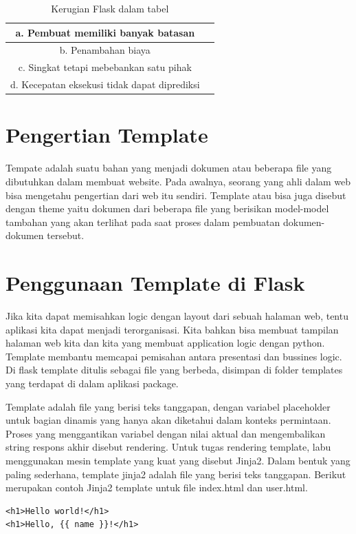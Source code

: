 \begin{table} [ht]
\caption{Kerugian Flask dalam tabel}
\centering
\begin {tabular} {|cc|}
\hline
a. Pembuat memiliki banyak batasan & \\
\hline
b. Penambahan biaya &\\
\hline
c. Singkat tetapi mebebankan satu pihak & \\
\hline
d. Kecepatan eksekusi tidak dapat diprediksi & \\
\hline
\end{tabular}
\label{ltabel}
\end{table}

\section{Pengertian Template}
Tempate adalah suatu bahan yang menjadi dokumen atau beberapa file yang dibutuhkan dalam membuat website. Pada awalnya, seorang yang 
ahli dalam web bisa mengetahu pengertian dari web itu sendiri. Template atau bisa juga disebut dengan theme yaitu dokumen dari beberapa 
file yang berisikan model-model tambahan yang akan terlihat pada saat proses dalam pembuatan dokumen-dokumen tersebut.

\section{Penggunaan Template di Flask}
Jika kita dapat memisahkan logic dengan layout dari sebuah halaman web, tentu aplikasi kita dapat menjadi terorganisasi. Kita bahkan 
bisa membuat tampilan halaman web kita dan kita yang membuat application logic dengan python. Template membantu memcapai pemisahan 
antara presentasi dan bussines logic. Di flask template ditulis sebagai file yang berbeda, disimpan di folder templates yang terdapat di 
dalam aplikasi package.

Template adalah file yang berisi teks tanggapan, dengan variabel placeholder untuk bagian dinamis yang hanya akan diketahui dalam konteks permintaan. Proses yang menggantikan variabel dengan nilai aktual dan mengembalikan string respons akhir disebut rendering.
Untuk tugas rendering template, labu menggunakan mesin template yang kuat yang disebut Jinja2. Dalam bentuk yang paling sederhana, template jinja2 adalah file yang berisi teks tanggapan. Berikut merupakan contoh Jinja2 template untuk file index.html dan user.html.
\begin{verbatim}
<h1>Hello world!</h1>
<h1>Hello, {{ name }}!</h1>
\end{verbatim}

